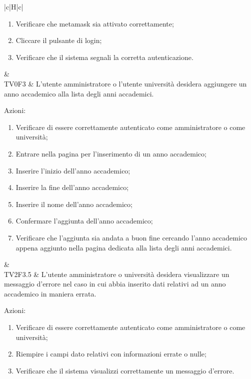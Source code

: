 \begin{longtable}{|c|H|c|}
\begin{flushleft}
			\end{flushleft} 
		\begin{enumerate}
			\item Verificare che metamask sia attivato correttamente;
			\item Cliccare il pulsante di login;
			\item Verificare che il sistema segnali la corretta autenticazione.
		\end{enumerate} & \Tni \\
	\hline
	TV0F3 & L'utente amministratore o l'utente università desidera aggiungere un anno accademico alla lista degli anni accademici. \newline \begin{flushleft}
		Azioni:\newline
			\end{flushleft} 
		\begin{enumerate}
			\item Verificare di essere correttamente autenticato come amministratore o come università;
			\item Entrare nella pagina per l'inserimento di un anno accademico;
			\item Inserire l'inizio dell'anno accademico;
			\item Inserire la fine dell'anno accademico;
			\item Inserire il nome dell'anno accademico;
			\item Confermare l'aggiunta dell'anno accademico;
			\item Verificare che l'aggiunta sia andata a buon fine cercando l'anno accademico appena aggiunto nella pagina dedicata alla lista degli anni accademici.
		\end{enumerate} & \Tni \\ 
	\hline
	TV2F3.5 & L'utente amministratore o università desidera visualizzare un messaggio d'errore nel caso in cui abbia inserito dati relativi ad un anno accademico in maniera errata. \newline \begin{flushleft}
		Azioni:\newline
			\end{flushleft} 
		\begin{enumerate}
			\item Verificare di essere correttamente autenticato come amministratore o come università;
			\item Riempire i campi dato  relativi con informazioni errate o nulle;
			\item Verificare che il sistema visualizzi correttamente un messaggio d'errore.

\end{enumerate}
\end{longtable}
